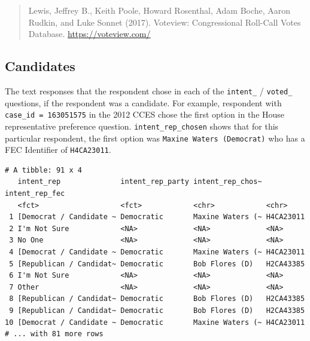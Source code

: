 \documentclass[10pt,article,oneside]{memoir}
\theoremstyle{definition}
\newenvironment{Shaded}{\begin{snugshade}}{\end{snugshade}}
\newcommand{\KeywordTok}[1]{\textcolor[rgb]{0.13,0.29,0.53}{\textbf{#1}}}
\newcommand{\DecValTok}[1]{\textcolor[rgb]{0.00,0.00,0.81}{#1}}
\newcommand{\StringTok}[1]{\textcolor[rgb]{0.31,0.60,0.02}{#1}}
\newcommand{\OperatorTok}[1]{\textcolor[rgb]{0.81,0.36,0.00}{\textbf{#1}}}
\newcommand{\NormalTok}[1]{#1}
\begin{document}
\begin{quote}
Lewis, Jeffrey B., Keith Poole, Howard Rosenthal, Adam Boche, Aaron
Rudkin, and Luke Sonnet (2017). Voteview: Congressional Roll-Call Votes
Database. \url{https://voteview.com/}
\end{quote}

\subsection{Candidates}\label{candidates}

The text responses that the respondent chose in each of the
\texttt{intent\_} / \texttt{voted\_} questions, if the respondent was a
candidate. For example, respondent with \texttt{case\_id\ =\ 163051575}
in the 2012 CCES chose the first option in the House representative
preference question. \texttt{intent\_rep\_chosen} shows that for this
particular respondent, the first option was
\texttt{Maxine\ Waters\ (Democrat)} who has a FEC Identifier of
\texttt{H4CA23011}.

\begin{Shaded}
\end{Shaded}

\begin{verbatim}
# A tibble: 91 x 4
   intent_rep              intent_rep_party intent_rep_chos~ intent_rep_fec
   <fct>                   <fct>            <chr>            <chr>         
 1 [Democrat / Candidate ~ Democratic       Maxine Waters (~ H4CA23011     
 2 I'm Not Sure            <NA>             <NA>             <NA>          
 3 No One                  <NA>             <NA>             <NA>          
 4 [Democrat / Candidate ~ Democratic       Maxine Waters (~ H4CA23011     
 5 [Republican / Candidat~ Democratic       Bob Flores (D)   H2CA43385     
 6 I'm Not Sure            <NA>             <NA>             <NA>          
 7 Other                   <NA>             <NA>             <NA>          
 8 [Republican / Candidat~ Democratic       Bob Flores (D)   H2CA43385     
 9 [Republican / Candidat~ Democratic       Bob Flores (D)   H2CA43385     
10 [Democrat / Candidate ~ Democratic       Maxine Waters (~ H4CA23011     
# ... with 81 more rows
\end{verbatim}
\end{document}
